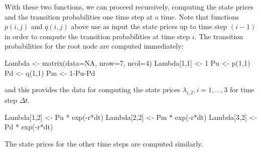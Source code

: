 \documentclass[]{tufte-book}
\newenvironment{Shaded}{}{}
\newcommand{\AttributeTok}[1]{\textcolor[rgb]{0.49,0.56,0.16}{#1}}
\newcommand{\ConstantTok}[1]{\textcolor[rgb]{0.53,0.00,0.00}{#1}}
\newcommand{\DecValTok}[1]{\textcolor[rgb]{0.25,0.63,0.44}{#1}}
\newcommand{\FunctionTok}[1]{\textcolor[rgb]{0.02,0.16,0.49}{#1}}
\newcommand{\NormalTok}[1]{#1}
\newcommand{\OtherTok}[1]{\textcolor[rgb]{0.00,0.44,0.13}{#1}}
\newcommand{\SpecialCharTok}[1]{\textcolor[rgb]{0.25,0.44,0.63}{#1}}
\begin{document}
With these two functions, we can proceed recursively, computing the
state prices and the transition probabilities one time step at a time.
Note that functions \(p(i,j)\) and \(q(i,j)\) above use as input the state prices up
to time step \((i-1)\) in order to compute the transition probabilities at
time step \(i\). The transition probabilities for the root node are
computed immediately:

\begin{Shaded}
\begin{Highlighting}[]
\NormalTok{  Lambda }\OtherTok{\textless{}{-}} \FunctionTok{matrix}\NormalTok{(}\AttributeTok{data=}\ConstantTok{NA}\NormalTok{, }\AttributeTok{nrow=}\DecValTok{7}\NormalTok{, }\AttributeTok{ncol=}\DecValTok{4}\NormalTok{)}
\NormalTok{  Lambda[}\DecValTok{1}\NormalTok{,}\DecValTok{1}\NormalTok{] }\OtherTok{\textless{}{-}} \DecValTok{1}
\NormalTok{  Pu }\OtherTok{\textless{}{-}} \FunctionTok{p}\NormalTok{(}\DecValTok{1}\NormalTok{,}\DecValTok{1}\NormalTok{)}
\NormalTok{  Pd }\OtherTok{\textless{}{-}} \FunctionTok{q}\NormalTok{(}\DecValTok{1}\NormalTok{,}\DecValTok{1}\NormalTok{)}
\NormalTok{  Pm }\OtherTok{\textless{}{-}} \DecValTok{1}\SpecialCharTok{{-}}\NormalTok{Pu}\SpecialCharTok{{-}}\NormalTok{Pd}
\end{Highlighting}
\end{Shaded}

and this provides the data for computing the state prices
\(\lambda_{i,2}, i=1, \ldots, 3\) for time step \(\Delta t\).

\begin{Shaded}
\begin{Highlighting}[]
\NormalTok{  Lambda[}\DecValTok{1}\NormalTok{,}\DecValTok{2}\NormalTok{] }\OtherTok{\textless{}{-}}\NormalTok{ Pu }\SpecialCharTok{*} \FunctionTok{exp}\NormalTok{(}\SpecialCharTok{{-}}\NormalTok{r}\SpecialCharTok{*}\NormalTok{dt)}
\NormalTok{  Lambda[}\DecValTok{2}\NormalTok{,}\DecValTok{2}\NormalTok{] }\OtherTok{\textless{}{-}}\NormalTok{ Pm }\SpecialCharTok{*} \FunctionTok{exp}\NormalTok{(}\SpecialCharTok{{-}}\NormalTok{r}\SpecialCharTok{*}\NormalTok{dt)}
\NormalTok{  Lambda[}\DecValTok{3}\NormalTok{,}\DecValTok{2}\NormalTok{] }\OtherTok{\textless{}{-}}\NormalTok{ Pd }\SpecialCharTok{*} \FunctionTok{exp}\NormalTok{(}\SpecialCharTok{{-}}\NormalTok{r}\SpecialCharTok{*}\NormalTok{dt)}
\end{Highlighting}
\end{Shaded}

The state prices for the other time steps are computed similarly.
\end{document}
